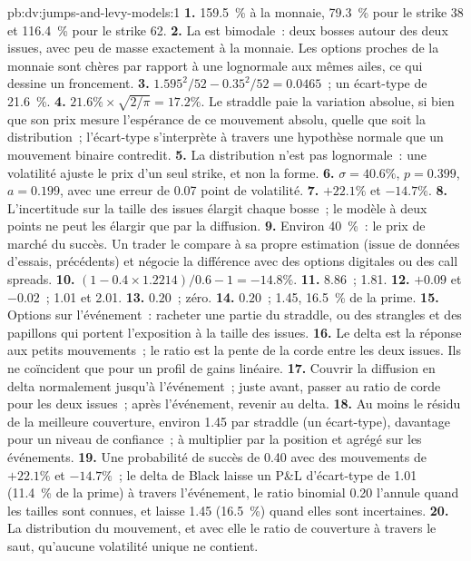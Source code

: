 \begin{solution}{pb:dv:jumps-and-levy-models:1}
\textbf{1.} 159.5~\% à la monnaie, 79.3~\% pour le strike 38 et 116.4~\% pour le strike 62.
\textbf{2.} La  est bimodale~: deux bosses autour des deux issues, avec peu de masse exactement à la monnaie. Les options
proches de la monnaie sont chères par rapport à une lognormale aux mêmes ailes, ce qui dessine un froncement.
\textbf{3.} $1.595^2/52-0.35^2/52=0.0465$~; un écart-type de 21.6~\%.
\textbf{4.} $21.6\%\times\sqrt{2/\pi}=17.2\%$. Le straddle paie la variation absolue, si bien que son prix mesure
l'espérance de ce mouvement absolu, quelle que soit la distribution~; l'écart-type s'interprète à travers une hypothèse normale que
un mouvement binaire contredit.
\textbf{5.} La distribution n'est pas lognormale~: une volatilité ajuste le prix d'un seul strike, et non la forme.
\textbf{6.} $\sigma=40.6\%$, $p=0.399$, $a=0.199$, avec une erreur de 0.07 point de volatilité.
\textbf{7.} $+22.1\%$ et $-14.7\%$.
\textbf{8.} L'incertitude sur la taille des issues élargit chaque bosse~; le modèle à deux points ne peut les élargir que
par la diffusion.
\textbf{9.} Environ 40~\%~: le prix de marché du succès. Un trader le compare à sa propre estimation (issue de données d'essais,
précédents) et négocie la différence avec des options digitales ou des call spreads.
\textbf{10.} $(1-0.4\times1.2214)/0.6-1=-14.8\%$.
\textbf{11.} 8.86~; 1.81.
\textbf{12.} $+0.09$ et $-0.02$~; 1.01 et 2.01.
\textbf{13.} $0.20$~; zéro.
\textbf{14.} $0.20$~; 1.45, 16.5~\% de la prime.
\textbf{15.} Options sur l'événement~: racheter une partie du straddle, ou des strangles et des papillons qui portent
l'exposition à la taille des issues.
\textbf{16.} Le delta est la réponse aux petits mouvements~; le ratio est la pente de la corde entre les deux issues. Ils ne coïncident que
pour un profil de gains linéaire.
\textbf{17.} Couvrir la diffusion en delta normalement jusqu'à l'événement~; juste avant, passer au ratio de corde pour les
deux issues~; après l'événement, revenir au delta.
\textbf{18.} Au moins le résidu de la meilleure couverture, environ 1.45 par straddle (un écart-type), davantage pour un
niveau de confiance~; à multiplier par la position et agrégé sur les événements.
\textbf{19.} Une probabilité de succès de 0.40 avec des mouvements de $+22.1\%$ et $-14.7\%$~; le delta de Black laisse un P\&L
d'écart-type de 1.01 (11.4~\% de la prime) à travers l'événement, le ratio binomial 0.20 l'annule quand les tailles
sont connues, et laisse 1.45 (16.5~\%) quand elles sont incertaines.
\textbf{20.} La distribution du mouvement, et avec elle le ratio de couverture à travers le saut,
qu'aucune volatilité unique ne contient.
\end{solution}

